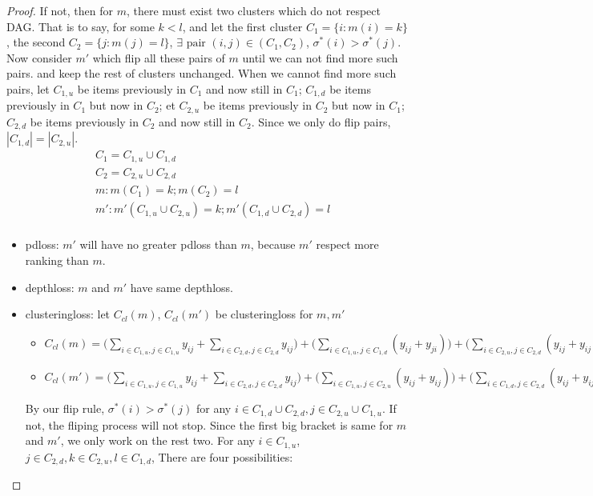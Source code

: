 \begin{proof}
	If not, then for $m$, there must exist two clusters which do not respect DAG. That is to say, for some $k<l$, and let the first cluster $C_1=\{i: m(i)=k\}$, the second $C_2=\{j:m(j)=l\}$, $\exists \text{ pair } (i,j)\in (C_1, C_2)$, $\sigma^*(i)>\sigma^*(j)$. Now consider $m'$ which flip all these pairs of $m$ until we can not find more such pairs. and keep the rest of clusters unchanged. When we cannot find more such pairs, let $C_{1,u}$ be items previously in $C_1$ and now still in $C_1$;   $C_{1, d}$ be items previously in $C_1$ but now in $C_2$;  et $C_{2,u}$ be items previously in $C_2$ but now in $C_1$;   $C_{2, d}$ be items previously in $C_2$ and now still in $C_2$. Since we only do flip pairs, $|C_{1,d}|=|C_{2,u}|$.
	\begin{equation}
	\begin{split}
	&C_1=  C_{1,u}\cup C_{1,d}\\
		&C_2=  C_{2,u}\cup C_{2,d}\\
		&m: m(C_1)=k; m(C_2)=l\\
		&m': m'(C_{1, u}\cup C_{2, u})=k; m'(C_{1,d}\cup C_{2, d})=l\\
	\end{split}
	\end{equation}
	\begin{itemize}
		\item pdloss: $m'$ will have no greater pdloss than $m$, because $m'$ respect more ranking than $m$.
		\item depthloss: $m$ and $m'$ have same depthloss.
		\item clusteringloss: let $C_{cl}(m)$, $C_{cl}(m')$ be clusteringloss for $m, m'$
		\begin{itemize}
			\item $C_{cl}(m)=\bigg(\sum\limits_{i\in C_{1, u}, j\in C_{1, u}}y_{ij} + \sum\limits_{i\in C_{2, d}, j\in C_{2, d}}y_{ij} \bigg)+ \bigg(\sum\limits_{i\in C_{1, u}, j\in C_{1, d}}(y_{ij}+y_{ji}) \bigg)+\bigg( \sum\limits_{i\in C_{2, u}, j\in C_{2, d}}(y_{ij}+y_{ij})\bigg)$
						\item $C_{cl}(m')=\bigg(\sum\limits_{i\in C_{1, u}, j\in C_{1, u}}y_{ij} + \sum\limits_{i\in C_{2, d}, j\in C_{2, d}}y_{ij} \bigg)+ \bigg(\sum\limits_{i\in C_{1, u}, j\in C_{2, u}}(y_{ij}+ y_{ij})\bigg)+\bigg( \sum\limits_{i\in C_{1, d}, j\in C_{2, d}}(y_{ij}+y_{ij})\bigg)$
		\end{itemize}
	By our flip rule, $\sigma^*(i)>\sigma^*(j)$ for any $i\in C_{1,d}\cup C_{2,d}, j\in C_{2,u}\cup C_{1,u}$. If not, the fliping process will not stop. Since the first big bracket is same for $m$ and $m'$, we only work on the rest two. For any $i\in C_{1,u}$, $j\in C_{2,d}, k\in C_{2,u}, l\in C_{1,d} $, There are four possibilities:

\end{itemize}
\end{proof}
